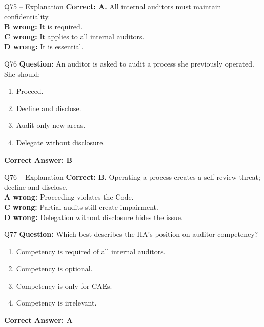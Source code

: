 \documentclass[aspectratio=169,10pt]{beamer}
\begin{document}
	\begin{frame}[t]{Q75 -- Explanation}
		\small
		\textbf{Correct: A.} All internal auditors must maintain confidentiality. \\[4pt]
		\textbf{B wrong:} It is required. \\[2pt]
		\textbf{C wrong:} It applies to all internal auditors. \\[2pt]
		\textbf{D wrong:} It is essential.
	\end{frame}
	
	\begin{frame}[t]{Q76}
		\small
		\textbf{Question:} An auditor is asked to audit a process she previously operated. She should:
		\begin{enumerate}[label=\Alph*.,itemsep=1pt,topsep=2pt]
			\item Proceed.
			\item Decline and disclose.
			\item Audit only new areas.
			\item Delegate without disclosure.
		\end{enumerate}
		\vspace{4pt}
		\textbf{Correct Answer: B}
	\end{frame}
	
	\begin{frame}[t]{Q76 -- Explanation}
		\small
		\textbf{Correct: B.} Operating a process creates a self-review threat; decline and disclose. \\[4pt]
		\textbf{A wrong:} Proceeding violates the Code. \\[2pt]
		\textbf{C wrong:} Partial audits still create impairment. \\[2pt]
		\textbf{D wrong:} Delegation without disclosure hides the issue.
	\end{frame}
	
	\begin{frame}[t]{Q77}
		\small
		\textbf{Question:} Which best describes the IIA's position on auditor competency?
		\begin{enumerate}[label=\Alph*.,itemsep=1pt,topsep=2pt]
			\item Competency is required of all internal auditors.
			\item Competency is optional.
			\item Competency is only for CAEs.
			\item Competency is irrelevant.
		\end{enumerate}
		\vspace{4pt}
		\textbf{Correct Answer: A}
	\end{frame}
	
\end{document}
